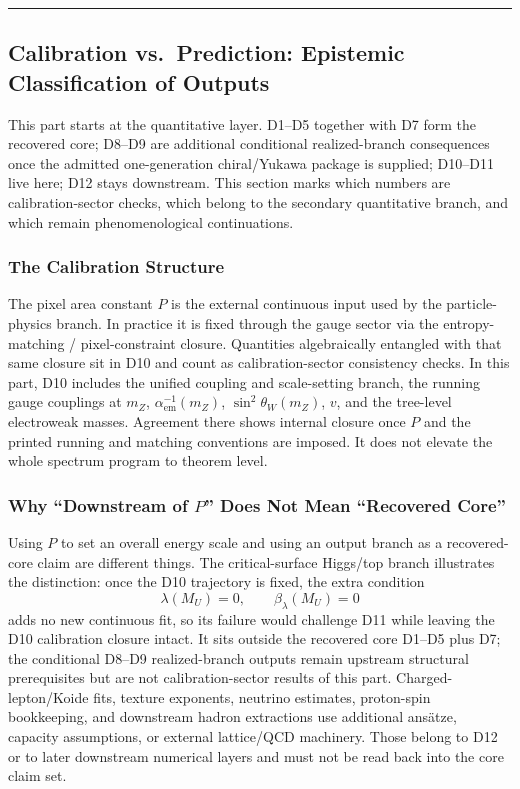 \begin{center}\rule{0.5\linewidth}{0.5pt}\end{center}

\subsection{Calibration vs.\ Prediction: Epistemic Classification of Outputs}\label{1b-calibration-vs-prediction}

This part starts at the quantitative layer. D1--D5 together with D7 form the recovered core; D8--D9 are additional conditional realized-branch consequences once the admitted one-generation chiral/Yukawa package is supplied; D10--D11 live here; D12 stays downstream. This section marks which numbers are calibration-sector checks, which belong to the secondary quantitative branch, and which remain phenomenological continuations.

\subsubsection{The Calibration Structure}\label{1b1-the-calibration-structure}

The pixel area constant \(P\) is the external continuous input used by the particle-physics branch. In practice it is fixed through the gauge sector via the entropy-matching / pixel-constraint closure. Quantities algebraically entangled with that same closure sit in D10 and count as calibration-sector consistency checks. In this part, D10 includes the unified coupling and scale-setting branch, the running gauge couplings at \(m_Z\), \(\alpha_{\mathrm{em}}^{-1}(m_Z)\), \(\sin^2\theta_W(m_Z)\), \(v\), and the tree-level electroweak masses. Agreement there shows internal closure once \(P\) and the printed running and matching conventions are imposed. It does not elevate the whole spectrum program to theorem level.

\subsubsection{Why ``Downstream of \(P\)'' Does Not Mean ``Recovered Core''}\label{1b2-dimensionless-independence}

Using \(P\) to set an overall energy scale and using an output branch as a recovered-core claim are different things. The critical-surface Higgs/top branch illustrates the distinction: once the D10 trajectory is fixed, the extra condition
\[
\lambda(M_U)=0,\qquad \beta_\lambda(M_U)=0
\]
adds no new continuous fit, so its failure would challenge D11 while leaving the D10 calibration closure intact. It sits outside the recovered core D1--D5 plus D7; the conditional D8--D9 realized-branch outputs remain upstream structural prerequisites but are not calibration-sector results of this part. Charged-lepton/Koide fits, texture exponents, neutrino estimates, proton-spin bookkeeping, and downstream hadron extractions use additional ans\"atze, capacity assumptions, or external lattice/QCD machinery. Those belong to D12 or to later downstream numerical layers and must not be read back into the core claim set.

